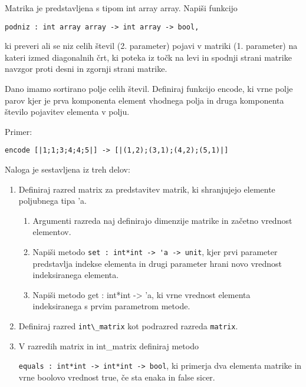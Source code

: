 \begin{ex}
Matrika je predstavljena s tipom int array array. Napi\v si funkcijo 
\begin{lstlisting}
podniz : int array array -> int array -> bool,
\end{lstlisting}
ki preveri ali se niz celih \v stevil (2. parameter) pojavi v matriki (1. parameter) na kateri izmed diagonalnih \v crt, ki poteka iz to\v ck na levi in spodnji strani matrike navzgor proti desni in zgornji strani matrike.
\end{ex} 




\begin{ex}
Dano imamo sortirano polje celih \v stevil. Definiraj funkcijo encode, ki vrne polje parov kjer je prva komponenta element vhodnega polja in druga komponenta \v stevilo pojavitev elementa v polju.   

Primer:
\begin{lstlisting}
encode [|1;1;3;4;4;5|] -> [|(1,2);(3,1);(4,2);(5,1)|]
\end{lstlisting}
\end{ex} 




\begin{ex} Naloga je sestavljena iz treh delov:
\begin{enumerate}
  \item  Definiraj razred matrix za predstavitev matrik, ki shranjujejo
  elemente poljubnega tipa 'a.
\begin{enumerate}
    \item Argumenti razreda naj definirajo dimenzije matrike in za\v cetno
  vrednost elementov.
  \item Napi\v si metodo 
  \lstinline{set : int*int -> 'a -> unit}, kjer prvi parameter
  predstavlja indekse elementa in drugi parameter hrani novo vrednost
  indeksiranega elementa.
  \item Napi\v si metodo get : int*int -> 'a, ki vrne vrednost elementa
  indeksiranega s prvim parametrom metode.
\end{enumerate}
       
  \item Definiraj razred \lstinline{int\_matrix} kot podrazred razreda \lstinline{matrix}.

  \item V razredih matrix in int\_matrix definiraj metodo 
  
\noindent  \lstinline{equals : int*int -> int*int -> bool},
    ki primerja dva elementa matrike in vrne
  boolovo vrednost true, \v ce sta enaka in false sicer.
\end{enumerate}
\end{ex} 




